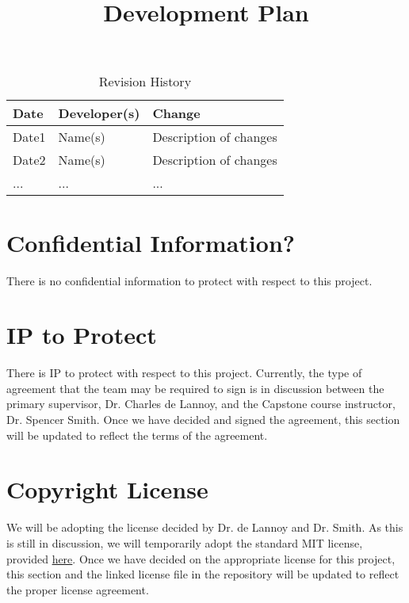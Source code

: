 \documentclass{article}
\title{Development Plan\\\progname}
\author{\authname}
\date{}
\begin{document}
\maketitle

\begin{table}[hp]
\caption{Revision History} \label{TblRevisionHistory}
\begin{tabularx}{\textwidth}{llX}
\toprule
\textbf{Date} & \textbf{Developer(s)} & \textbf{Change}\\
\midrule
Date1 & Name(s) & Description of changes\\
Date2 & Name(s) & Description of changes\\
... & ... & ...\\
\bottomrule
\end{tabularx}
\end{table}

\newpage{}



\section{Confidential Information?}

There is no confidential information to protect with respect to this project.

\section{IP to Protect}

There is IP to protect with respect to this project. Currently, the type of
agreement that the team may be required to sign is in discussion between the
primary supervisor, Dr. Charles de Lannoy, and the Capstone course instructor,
Dr. Spencer Smith. Once we have decided and signed the agreement, this section
will be updated to reflect the terms of the agreement.

\section{Copyright License}

We will be adopting the license decided by Dr. de Lannoy and Dr. Smith. As this is
still in discussion, we will temporarily adopt the standard MIT license, provided
\href{https://github.com/SumanyaG/Alkalytics/blob/main/LICENSE}{here}. Once we have
decided on the appropriate license for this project, this section and the linked
license file in the repository will be updated to reflect the proper license
agreement.
\end{document}
